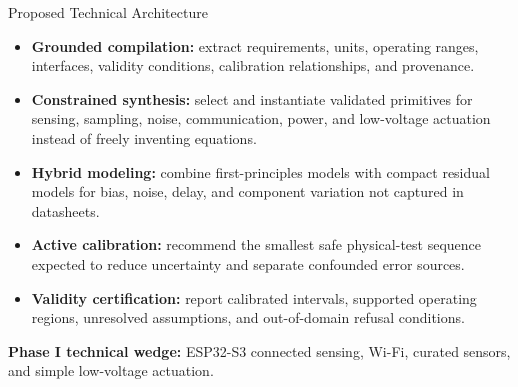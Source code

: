 \documentclass[a4paper,landscape]{article}
\begin{document}
\begin{minipage}[t]{0.47\textwidth}
\begin{vmBox}[height=67.7mm]{Proposed Technical Architecture}
\centering
{}

\vspace{1.2mm}
\begin{minipage}{0.97\linewidth}
\begin{itemize}
\item \textbf{Grounded compilation:} extract requirements, units, operating ranges, interfaces, validity conditions, calibration relationships, and provenance.
\item \textbf{Constrained synthesis:} select and instantiate validated primitives for sensing, sampling, noise, communication, power, and low-voltage actuation instead of freely inventing equations.
\item \textbf{Hybrid modeling:} combine first-principles models with compact residual models for bias, noise, delay, and component variation not captured in datasheets.
\item \textbf{Active calibration:} recommend the smallest safe physical-test sequence expected to reduce uncertainty and separate confounded error sources.
\item \textbf{Validity certification:} report calibrated intervals, supported operating regions, unresolved assumptions, and out-of-domain refusal conditions.
\end{itemize}
\end{minipage}

\vspace{0.8mm}
\colorbox{VMLight}{\parbox{0.94\linewidth}{\centering\textbf{Phase I technical wedge:} ESP32-S3 connected sensing, Wi-Fi, curated sensors, and simple low-voltage actuation.}}
\end{vmBox}
\end{minipage}
\end{document}
